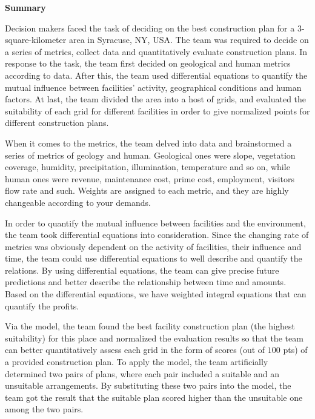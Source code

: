 \documentclass[./main.tex]{subfiles}
\begin{document}
    \begin{center}
        \large
        \textbf{Summary}
    \end{center}
        Decision makers faced the task of deciding on the best construction plan for a 3-square-kilometer area in Syracuse, NY, USA. The team was required to decide on a series of metrics, collect data and quantitatively evaluate construction plans.
        In response to the task, the team first decided on geological and human metrics according to data.
        After this, the team used differential equations to quantify the mutual influence between facilities' activity, geographical conditions and human factors.
        At last, the team divided the area into a host of grids, and evaluated the suitability of each grid for different facilities in order to give normalized points for different construction plans.

        \vspace{1.25em}

        When it comes to the metrics, the team delved into data and brainstormed a series of metrics of geology and human.
        Geological ones were slope, vegetation coverage, humidity, precipitation, illumination, temperature and so on, while human ones were revenue, maintenance cost, prime cost, employment, visitors flow rate and such.
        Weights are assigned to each metric, and they are highly changeable according to your demands.

        \vspace{1.25em}

        In order to quantify the mutual influence between facilities and the environment, the team took differential equations into consideration.
        Since the changing rate of metrics was obviously dependent on the activity of facilities, their influence and time, the team could use differential equations to well describe and quantify the relations.
        By using differential equations, the team can give precise future predictions and better describe the
        relationship between time and amounts.
        Based on the differential equations, we have weighted integral equations that can quantify the profits.

        \vspace{1.25em}

        Via the model, the team found the best facility construction plan (the highest suitability) for this place and normalized the evaluation results so that the team can better quantitatively assess each grid in the form of scores (out of $100$ pts) of a provided construction plan.
        To apply the model, the team artificially determined two pairs of plans, where each pair included a suitable and an unsuitable arrangements.
        By substituting these two pairs into the model, the team got the result that the suitable plan scored higher
    than the unsuitable one among the two pairs.
\end{document}
